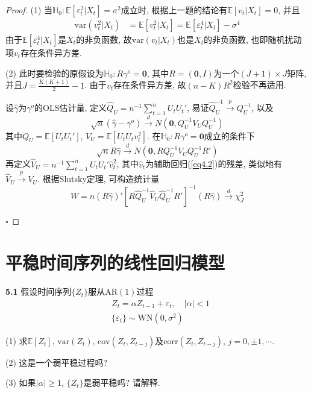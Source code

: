 \documentclass[cn,12pt,math=mtpro2,citestyle=gb7714-2015,bibstyle=gb7714-2015,twocol,mode=simple]{elegantbook}
\newcommand{\E}{\mathbb{E}}
\newcommand{\var}{\text{var}}
\begin{document}
  \begin{proof}
  (1) 当$\mathbb{H}_0: \E[\varepsilon_t^2|X_t]=\sigma^2$成立时, 根据上一题的结论有$\E[v_t|X_t]=0$, 并且
  \begin{align*}
  \var(v_t^2|X_t)&=\E[v_t^2|X_t]=\E[\varepsilon_t^4|X_t]-\sigma^4
  \end{align*}
  由于$\E[\varepsilon_t^4|X_t]$是$X_t$的非负函数, 故$\var(v_t|X_t)$也是$X_t$的非负函数, 也即随机扰动项$v_t$存在条件异方差.

  (2)  此时要检验的原假设为$\mathbb{H}_0: R\gamma^o=\mathbf{0}$, 其中$R=(\mathbf{0},I)$为一个$(J+1)\times J$矩阵, 并且$\displaystyle J=\frac{K(K+1)}{2}-1$. 由于$v_t$存在条件异方差, 故$(n-K)R^2$检验不再适用.

  设$\hat{\gamma}$为$\gamma^o$的OLS估计量, 定义$\displaystyle \hat{Q}_{U}=n^{-1}\sum_{t=1}^{n}U_tU_t'$, 易证$\hat{Q}_{U}^{-1}\xrightarrow{p}Q_{U}^{-1}$, 以及
  $$\sqrt{n}(\hat{\gamma}-\gamma^o)\xrightarrow{d}N(\mathbf{0}, Q_{U}^{-1}V_{U}Q_{U}^{-1})$$
  其中$Q_{U}=\E[U_tU_t']$, $V_{U}=\E[U_tU_tv_t^2]$. 在$\mathbb{H}_0: R\gamma^o=\mathbf{0}$成立的条件下
  $$\sqrt{n}R\hat{\gamma}\xrightarrow{d}N(\mathbf{0}, RQ_{U}^{-1}V_{U}Q_{U}^{-1}R')$$
  再定义$\displaystyle \hat{V}_{U}=n^{-1}\sum_{t=1}^{n}U_tU_t'\hat{v}_t^2$, 其中$\hat{v}_t$为辅助回归(\ref{eq4.2})的残差, 类似地有$\hat{V}_{U}\xrightarrow{p}V_{U}$. 根据Slutsky定理, 可构造统计量
  $$W=n(R\hat{\gamma})'[R\hat{Q}_{U}^{-1}\hat{V}_{U}\hat{Q}_{U}^{-1}R']^{-1}(R\hat{\gamma})\xrightarrow{d}\chi_J^2$$

  $\square$
  \end{proof}
  \newpage

\chapter*{平稳时间序列的线性回归模型}
\textbf{5.1} 假设时间序列$\{Z_t\}$服从$\text{AR}(1)$过程
  \begin{align*}
  &Z_t=\alpha Z_{t-1}+\varepsilon_t,\quad |\alpha|<1 \\
  &\{\varepsilon_t\}\sim \text{WN}(0,\sigma^2)
  \end{align*}

(1) 求$\E[Z_t]$, $\var(Z_t)$, $\text{cov}(Z_t,Z_{t-j})$及$\text{corr}(Z_t,Z_{t-j})$, $j=0, \pm 1, \cdots$.

(2) 这是一个弱平稳过程吗?

(3) 如果$|\alpha|\geq1$, $\{Z_t\}$是弱平稳吗? 请解释.
\end{document}
